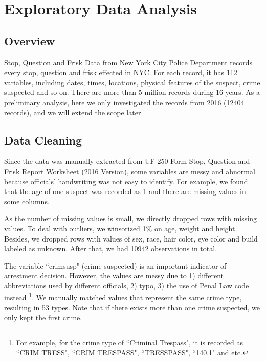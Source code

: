 \documentclass[letterpaper, twocolumn]{article}
\begin{document}
\section{Exploratory Data Analysis}
\subsection{Overview}

\href{https://www1.nyc.gov/site/nypd/stats/reports-analysis/stopfrisk.page}{Stop, Question and Frisk Data} from New York City Police Department records every stop, question and frisk effected in NYC. For each record, it has 112 variables, including dates, times, locations, physical features of the suspect, crime suspected and so on. There are more than 5 million records during 16 years. As a preliminary analysis, here we only investigated the records from 2016 (12404 records), and we will extend the scope later.

\subsection{Data Cleaning}

Since the data was manually extracted from UF-250 Form Stop, Question and Frisk Report Worksheet (\href{https://www.prisonlegalnews.org/news/publications/blank-uf-250-form-stop-question-and-frisk-report-worksheet-nypd-2016/}{2016 Version}), some variables are messy and abnormal because officials' handwriting was not easy to identify. For example, we found that the age of one suspect was recorded as 1 and there are missing values in some columns. 

As the number of missing values is small, we directly dropped rows with missing values. To deal with outliers, we winsorized 1\% on age, weight and height. Besides, we dropped rows with values of sex, race, hair color, eye color and build labeled as unknown.  %
After that, we had 10942 observations in total.

The variable ``crimsusp" (crime suspected) is an important indicator of arrestment decision. However, the values are messy due to 1) different abbreviations used by different officials, 2) typo, 3) the use of Penal Law code instead \footnote{For example, for the crime type of ``Criminal Trespass", it is recorded as ``CRIM TRESS", ``CRIM TRESPASS", ``TRESSPASS", ``140.1" and etc.}. We manually matched values that represent the same crime type, resulting in 53 types. Note that if there exists more than one crime suspected, we only kept the first crime.
\end{document}
